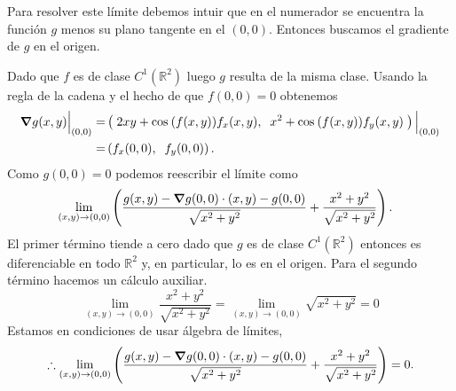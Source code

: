 
\begin{solution}
    Para resolver este límite debemos intuir que en el numerador se encuentra la función $g$ menos su plano tangente en el $(0,0)$. Entonces buscamos el gradiente de $g$ en el origen.

    Dado que $f$ es  de  clase \(C^1(\mathbb{R}^2)\) luego $g$  resulta de la misma clase.  Usando la regla de la cadena  y el hecho de que $f(0,0)=0$ obtenemos
    \begin{align*}
        \grad g(x,y)\Big\rvert_{(0,0)}= & \left( \;2xy+\cos\:(f(x,y))f_x(x,y),\;\; x^2+\cos\:(f(x,y))f_y(x,y)\; \right) \Big\rvert_{(0,0)} \\
        =                                & \left( f_x(0,0),\;\; f_y(0,0) \right).
    \end{align*}
    Como $g(0,0)=0$ podemos reescribir el límite como
    \begin{align*}
         & \lim_{(x,y)\to(0,0)} \left(\frac{g(x,y)-\grad g(0,0)\cdot(x,y)-g(0,0)}{\sqrt{x^2+y^2}}+\frac{x^2+y^2}{\sqrt{x^2+y^2}}\right).
    \end{align*}
    El primer término tiende a cero dado que $g$ es  de  clase \(C^1(\mathbb{R}^2)\)  entonces es diferenciable en todo $\mathbb{R}^{2}$ y,  en particular, lo es en el origen.  Para el segundo término hacemos un cálculo auxiliar.
    \[
        \lim_{(x,y)\to(0,0)}\frac{x^2+y^2}{\sqrt{x^2+y^2}}=\lim_{(x,y)\to(0,0)}\sqrt{x^2+y^2}=0
    \]
    Estamos en condiciones de usar \'algebra de l\'imites,
    \[
        \therefore \lim_{(x,y)\to(0,0)} \left(\frac{g(x,y)-\grad g(0,0)\cdot(x,y)-g(0,0)}{\sqrt{x^2+y^2}}+\frac{x^2+y^2}{\sqrt{x^2+y^2}}\right)=0.
    \]
\end{solution}


